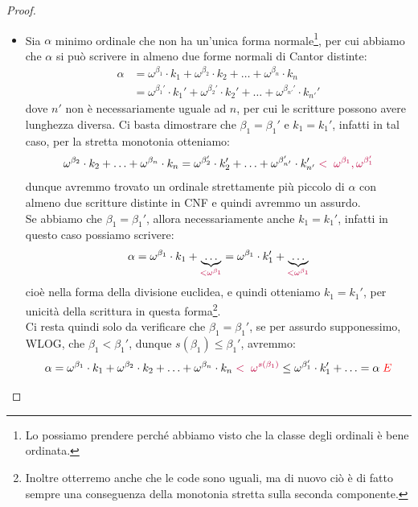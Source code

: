 \begin{proof}
\begin{itemize}
\[			\]
		e affinch\'e la disuguaglianza sia vera il sup al RHS deve essere ben definito, e lo \`e a condizione che l'insieme di ordinali su cui \`e preso \`e non vuoto, ovvero a condizione che esista $\delta < \gamma$ tale che $\alpha < \omega^\delta$, contro la minimalit\`a di $\gamma$.\footnote{Come al
		solito si pu\`o osservare alternativamente anche che la disuguaglianza $\omega^\delta \leq \alpha$, valida per la minimalit\`a di $\gamma$, passa al sup generando ancora una volta un assurdo.}
		\item[$\boxed{\text{unicit\`a}}$] Sia $\alpha$ minimo ordinale che non ha un'unica forma normale\footnote{Lo possiamo prendere perch\'e abbiamo visto che la classe degli ordinali \`e bene ordinata.}, per cui abbiamo che $\alpha$ si pu\`o scrivere in almeno due forme normali di Cantor distinte:
		\[ \begin{split}
			\alpha &= \omega^{\beta_1} \cdot k_1 + \omega^{\beta_2} \cdot k_2 + \ldots + \omega^{\beta_n} \cdot k_n \\
				   &= \omega^{\beta_1'} \cdot k_1' + \omega^{\beta_2'} \cdot k_2' + \ldots + \omega^{\beta_{n'}'} \cdot k_{n'}'
		\end{split}
			\]
		dove $n'$ non \`e necessariamente uguale ad $n$, per cui le scritture possono avere lunghezza diversa.
		Ci basta dimostrare che $\beta_1 = \beta_1'$ e $k_1 = k_1'$, infatti in tal caso, per la stretta monotonia otteniamo:
		\[ \omega^{\beta_2} \cdot k_2 + \ldots + \omega^{\beta_n} \cdot k_n = \omega^{\beta_2'} \cdot k_2' + \ldots + \omega^{\beta_{n'}'} \cdot k_{n'}' \;\textcolor{purple}{<\;\omega^{\beta_1},\omega^{\beta_1'}} 
			\]
		dunque avremmo trovato un ordinale strettamente pi\`u piccolo di $\alpha$ con almeno due scritture distinte in CNF e quindi avremmo un assurdo.\\
		Se abbiamo che $\beta_1 = \beta_1'$, allora necessariamente anche $k_1 = k_1'$, infatti in questo caso possiamo scrivere:
		\[ \alpha = \omega^{\beta_1} \cdot k_1 + \underbrace{\ldots}_{\textcolor{purple}{< \omega^{\beta_1}}} = \omega^{\beta_1} \cdot k_1' + \underbrace{\ldots}_{\textcolor{purple}{< \omega^{\beta_1}}}
			\]
		cio\`e nella forma della divisione euclidea, e quindi otteniamo $k_1 = k_1'$, per unicit\`a della scrittura in questa forma\footnote{Inoltre otterremo anche che le code sono uguali, ma di nuovo ci\`o \`e di fatto sempre una conseguenza della monotonia stretta sulla seconda componente.}.\\
		Ci resta quindi solo da verificare che $\beta_1 = \beta_1'$, se per assurdo supponessimo, WLOG, che $\beta_1 < \beta_1'$, dunque $s(\beta_1) \leq \beta_1'$, avremmo:
		\[ \alpha = \omega^{\beta_1} \cdot k_1 + \omega^{\beta_2} \cdot k_2 + \ldots + \omega^{\beta_n} \cdot k_n \; \textcolor{purple}{<\; \omega^{s(\beta_1)}} \leq \omega^{\beta_1'} \cdot k_1' + \ldots = \alpha \; \textcolor{red}\lightning
			\]
	\end{itemize}
\end{proof}


